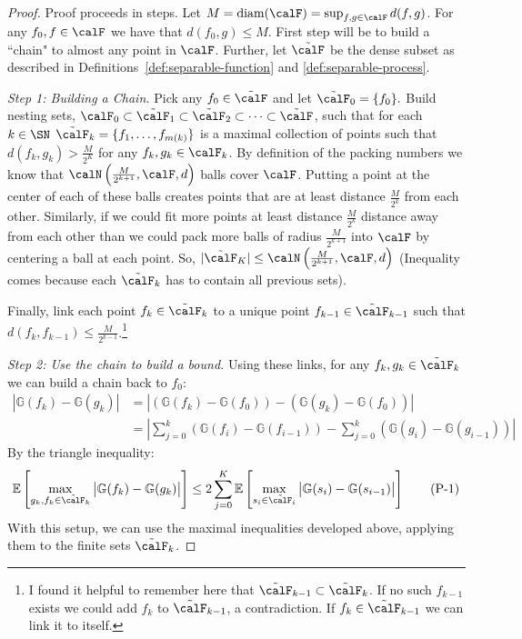 \begin{proof}
	Proof proceeds in steps. Let \(M = \text{diam}(\calF) = \sup_{f,g\in\calF}d(f,g)\). For any  \(f_0,f \in \calF\) we have that  \(d(f_0,g)\leq M\).	First step will be to build a ``chain" to almost any point in \(\calF\). Further, let \(\tilde\calF\) be the dense subset as described in Definitions~\ref{def:separable-function} and \ref{def:separable-process}.

	\emph{Step 1: Building a Chain.} Pick any \(f_0 \in\tilde\calF\) and let  \(\tilde\calF_0 = \{f_0\}.\) Build nesting sets, \(\calF_0 \subset\tilde\calF_1\subset\tilde\calF_2\subset\dots\subset\tilde\calF\), such that for each \(k\in\SN\)  \(\tilde\calF_k = \{f_1,\dots,f_{m(k)}\}\) is a maximal collection of points such that \(d(f_k,g_k) > \frac{M}{2^K} \) for any \(f_k,g_k\in\calF_k\). By definition of the packing numbers we know that  \(\calN\left(\frac{M}{2^{k+1}},\calF,d\right)\) balls cover \(\calF\). Putting a point at the center of each of these balls creates points that are at least distance \(\frac{M}{2^k}\) from each other. Similarly, if we could fit more points at least distance \(\frac{M}{2^{k}}\) distance away from each other than we could pack more balls of radius \(\frac{M}{2^{k+1}}\) into \(\calF\) by centering a ball at each point. So, \(|\tilde\calF_K| \leq \calN\left(\frac{M}{2^{k+1}},\calF,d
	\right)\) (Inequality comes because each \(\tilde\calF_k\) has to contain all previous sets). 

	Finally, link each point \(f_k \in \tilde\calF_k\) to a unique point  \(f_{k-1}\in\tilde\calF_{k-1}\) such that \(d(f_k,f_{k-1})\leq \frac{M}{2^{k-1}}\).\footnote{I found it helpful to remember here that \(\tilde\calF_{k-1}\subset\tilde\calF_k\). If no such \(f_{k-1}\) exists we could add  \(f_k\) to  \(\tilde\calF_{k-1}\), a contradiction. If  \(f_k \in \tilde\calF_{k-1}\) we can link it to itself. }

	\emph{Step 2: Use the chain to build a bound.} Using these links, for any \(f_k, g_k\in\tilde\calF_k\) we can build a chain back to \(f_0\):
	\begin{align*}
		\left|\mathbb{G}(f_k)-\mathbb{G}(g_k)\right|
		&=\left|\left(\mathbb{G}(f_k)-\mathbb{G}(f_0)\right) - \left(\mathbb{G}(g_k)-\mathbb{G}(f_0)\right)\right| \\
		&= \left|\sum_{j=0}^k\left(\mathbb{G}(f_i)-\mathbb{G}(f_{i-1})\right)-\sum_{j=0}^k \left(\mathbb{G}(g_i)-\mathbb{G}(g_{i-1})\right)\right|
	\end{align*}
	By the triangle inequality:
	\begin{equation}
		\label{eq:step2}
		\E\left[\max_{g_k,f_k\in\tilde\calF_k}\left|\mathbb{G}(f_k)-\mathbb{G}(g_k)\right|\right]
		\leq 2\sum_{j=0}^K \E\left[\max_{s_i\in\tilde\calF_i}\left|\mathbb{G}(s_i)-\mathbb{G}(s_{i-1})\right|\right]\tag{P-1}
	\end{equation}	
	With this setup, we can use the maximal inequalities developed above, applying them to the finite sets \(\tilde\calF_k\).


\end{proof}
